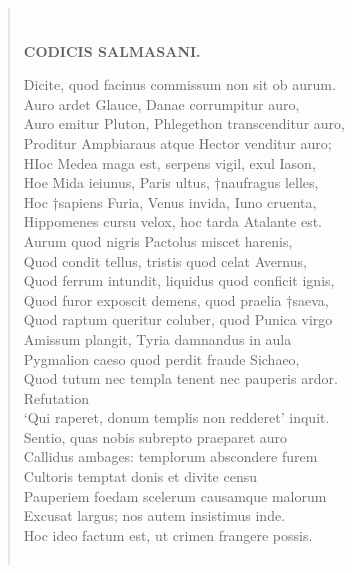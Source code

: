 \documentclass[11pt, a4paper]{report}
\begin{document}
\begin{verse}
        ﻿\pagebreak 
     \marginpar{[93]} \begin{center} \textbf{CODICIS SALMASANI.} \end{center}Dicite, quod facinus commissum non sit ob aurum. \\ Auro ardet Glauce, Danae corrumpitur auro, \\ Auro emitur Pluton, Phlegethon transcenditur auro, \\ Proditur Ampbiaraus atque Hector venditur auro; \\ HIoc Medea maga est, serpens vigil, exul Iason, \\ Hoe Mida ieiunus, Paris ultus, †naufragus lelles, \\ Hoc †sapiens Furia, Venus invida, Iuno cruenta, \\ Hippomenes cursu velox, hoc tarda Atalante est. \\ Aurum quod nigris Pactolus miscet harenis, \\ Quod condit tellus, tristis quod celat Avernus, \\ Quod ferrum intundit, liquidus quod conficit ignis, \\ Quod furor exposcit demens, quod praelia †saeva, \\ Quod raptum queritur coluber, quod Punica virgo \\ Amissum plangit, Tyria damnandus in aula \\ Pygmalion caeso quod perdit fraude Sichaeo, \\ Quod tutum nec templa tenent nec pauperis ardor. \\  \lbrack Refutation \rbrack  \\ ‘Qui raperet, donum templis non redderet’ inquit. \\ Sentio, quas nobis subrepto praeparet auro \\ Callidus ambages: templorum abscondere furem \\ Cultoris temptat donis et divite censu \\ Pauperiem foedam scelerum causamque malorum \\ Excusat largus; nos autem insistimus inde. \\ Hoc ideo factum est, ut crimen frangere possis. \\ 
        ﻿\pagebreak 

\end{verse}
\end{document}
